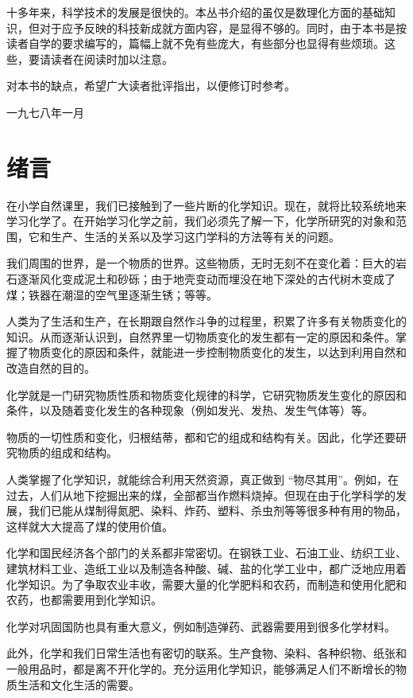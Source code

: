 十多年来，科学技术的发展是很快的。本丛书介绍的虽仅是数理化方面的基础知识，但对于应予反映的科技新成就方面内容，是显得不够的。同时，由于本书是按读者自学的要求编写的，篇幅上就不免有些庞大，有些部分也显得有些烦琐。这些，要请读者在阅读时加以注意。

对本书的缺点，希望广大读者批评指出，以便修订时参考。

一九七八年一月

\chapter{绪言}

在小学自然课里，我们已接触到了一些片断的化学知识。现在，就将比较系统地来学习化学了。在开始学习化学之前，我们必须先了解一下，化学所研究的对象和范围，它和生产、生活的关系以及学习这门学科的方法等有关的问题。

我们周围的世界，是一个物质的世界。这些物质，无时无刻不在变化着：巨大的岩石逐渐风化变成泥土和砂砾；由于地壳变动而埋没在地下深处的古代树木变成了煤；铁器在潮湿的空气里逐渐生锈；等等。

人类为了生活和生产，在长期跟自然作斗争的过程里，积累了许多有关物质变化的知识。从而逐渐认识到，自然界里一切物质变化的发生都有一定的原因和条件。掌握了物质变化的原因和条件，就能进一步控制物质变化的发生，以达到利用自然和改造自然的目的。

化学就是一门研究物质性质和物质变化规律的科学，它研究物质发生变化的原因和条件，以及随着变化发生的各种现象（例如发光、发热、发生气体等）等。

物质的一切性质和变化，归根结蒂，都和它的组成和结构有关。因此，化学还要研究物质的组成和结构。

人类掌握了化学知识，就能综合利用天然资源，真正做到
``物尽其用''。例如，在过去，人们从地下挖掘出来的煤，全部都当作燃料烧掉。但现在由于化学科学的发展，我们已能从煤制得氮肥、染料、炸药、塑料、杀虫剂等等很多种有用的物品，这样就大大提高了煤的使用价值。

化学和国民经济各个部门的关系都非常密切。在钢铁工业、石油工业、纺织工业、建筑材料工业、造纸工业以及制造各种酸、碱、盐的化学工业中，都广泛地应用着化学知识。为了争取农业丰收，需要大量的化学肥料和农药，而制造和使用化肥和农药，也都需要用到化学知识。

化学对巩固国防也具有重大意义，例如制造弹药、武器需要用到很多化学材料。

此外，化学和我们日常生活也有密切的联系。生产食物、染料、各种织物、纸张和一般用品时，都是离不开化学的。充分运用化学知识，能够满足人们不断增长的物质生活和文化生活的需要。

